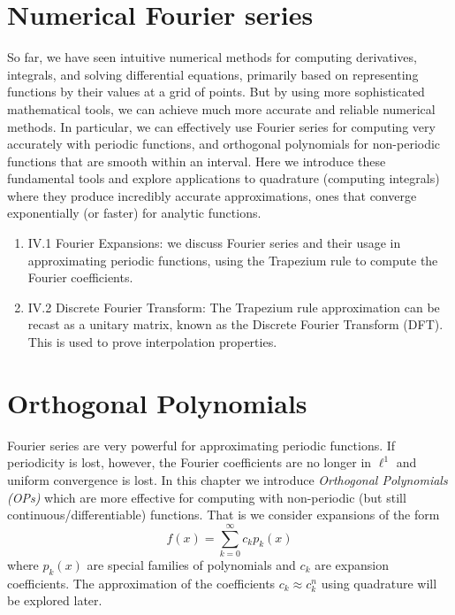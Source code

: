 \documentclass[12pt,a4paper]{book}
\theoremstyle{definition}
\begin{document}






 \chapter{Numerical Fourier series}

 So far, we have seen intuitive numerical methods for computing derivatives, integrals, and solving
 differential equations, primarily based on representing functions by their values at a grid of points.
 But by using more sophisticated mathematical tools, we can achieve much more accurate and reliable
 numerical methods. In particular, we can effectively use Fourier series for computing very accurately with periodic functions,
 and orthogonal polynomials for non-periodic functions that are smooth within an interval.
 Here we introduce these fundamental tools and explore applications to quadrature (computing integrals) where they
 produce incredibly accurate approximations, ones that converge exponentially (or faster) for analytic functions.

 \begin{enumerate}
     \item IV.1 Fourier Expansions: we discuss Fourier series and their usage in approximating periodic functions, using the Trapezium rule to compute the Fourier coefficients.
     \item IV.2 Discrete Fourier Transform: The Trapezium rule approximation can be recast as a unitary matrix, known as the Discrete Fourier Transform (DFT). This is used to prove interpolation properties.
\end{enumerate}




\chapter{Orthogonal Polynomials}

Fourier series are very powerful for approximating periodic functions.
If periodicity is lost, however, the Fourier coefficients are no longer in $\ell^1$ and uniform convergence is lost.
In this chapter
we introduce {\it Orthogonal Polynomials (OPs)} which are more effective for computing with
non-periodic (but still continuous/differentiable) functions. That is we consider expansions of the form
$$
f(x) = \sum_{k=0}^\infty c_k p_k(x)
$$
where $p_k(x)$ are special families of polynomials and $c_k$ are expansion coefficients.
The approximation of the coefficients $c_k \approx c_k^n$ using quadrature will be explored later.
\end{document}
